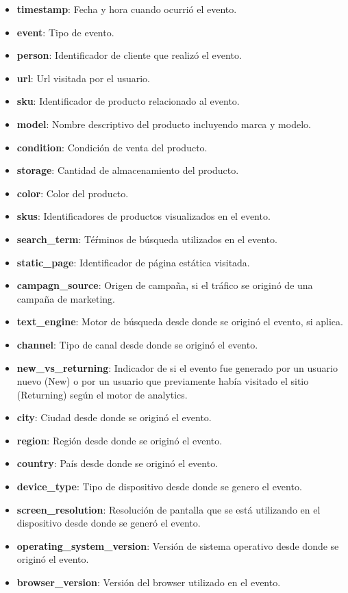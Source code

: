 \documentclass[a4paper]{article}
\begin{document}
\begin{itemize}
	\item \textbf{timestamp}: Fecha y hora cuando ocurrió el evento.
	\item \textbf{event}: Tipo de evento.
	\item \textbf{person}: Identificador de cliente que realizó el evento.
	\item \textbf{url}: Url visitada por el usuario.
	\item \textbf{sku}: Identificador de producto relacionado al evento.
	\item \textbf{model}: Nombre descriptivo del producto incluyendo marca y modelo.
	\item \textbf{condition}: Condición de venta del producto.
	\item \textbf{storage}: Cantidad de almacenamiento del producto.
	\item \textbf{color}: Color del producto.	
	\item \textbf{skus}: Identificadores de productos visualizados en el evento.
	\item \textbf{search\_term}: Téŕminos de búsqueda utilizados en el evento.
	\item \textbf{static\_page}: Identificador de página estática visitada.
	\item \textbf{campagn\_source}: Origen de campaña, si el tráfico se originó de una campaña de marketing.
	\item \textbf{text\_engine}: Motor de búsqueda desde donde se originó el evento, si aplica.
	\item \textbf{channel}: Tipo de canal desde donde se originó el evento.
	\item \textbf{new\_vs\_returning}: Indicador de si el evento fue generado por un usuario nuevo (New) o por un usuario que previamente había visitado el sitio (Returning) según el motor de analytics.
	\item \textbf{city}: Ciudad desde donde se originó el evento.
	\item \textbf{region}: Región desde donde se originó el evento.
	\item \textbf{country}: País desde donde se originó el evento.
	\item \textbf{device\_type}: Tipo de dispositivo desde donde se genero el evento.
	\item \textbf{screen\_resolution}: Resolución de pantalla que se está utilizando en el dispositivo desde donde se generó el evento.
	\item \textbf{operating\_system\_version}: Versión de sistema operativo desde donde se originó el evento.
	\item \textbf{browser\_version}: Versión del browser utilizado en el evento.
\end{itemize}
\end{document}
